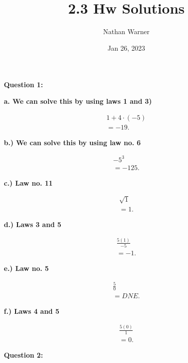 \documentclass{report}
\title{\Huge{2.3 Hw Solutions}}
\author{\huge{Nathan Warner}}
\date{\huge{Jan 26, 2023}}
\begin{document}
    \maketitle
    \begin{Large}
       \noindent \textbf{Question 1:} 
    \end{Large}
    
    \bigbreak \noindent \bigbreak \noindent 
    \textbf{a. We can solve this by using laws 1 and 3)}

    \bigbreak \noindent 
    \begin{align*}
         1 + 4 \cdot \left(-5\right) \\
         = -19
    .\end{align*}

    \bigbreak \noindent 
    \textbf{b.) We can solve this by using law no. 6} 
    
    \begin{align*}
        -5^3 \\ 
        = -125
    .\end{align*}

    \bigbreak \noindent 
    \textbf{c.) Law no. 11}

    \begin{align*}
        \sqrt{1} \\ 
        = 1 
    .\end{align*}

    \bigbreak \noindent 
    \textbf{d.) Laws 3 and 5}

    \begin{align*}
        \frac{5 \left(1\right)}{-5} \\ 
        = -1
    .\end{align*}

    \bigbreak \noindent 
    \textbf{e.) Law no. 5}

    \begin{align*}
        \frac{5}{0} \\
        = DNE
    .\end{align*}

    \bigbreak \noindent 
    \textbf{f.) Laws 4 and 5}

    \begin{align*}
        \frac{5 \left(0\right)}{1} \\ 
        = 0
    .\end{align*}

    \pagebreak
    \begin{Large}
       \noindent \textbf{Question 2:} 
    \end{Large}
\end{document}
